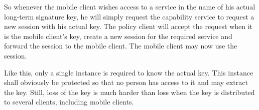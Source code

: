 So whenever the mobile client wishes access to a service in the name of his actual long-term signature key, he will simply request the capability service to request a new session with his actual key.
The policy client will accept the request when it is the mobile client's key, create a new session for the required service and forward the session to the mobile client.
The mobile client may now use the session.

Like this, only a single instance is required to know the actual key.
This instance shall obviously be protected so that no person has access to it and may extract the key.
Still, loss of the key is much harder than loss when the key is distributed to several clients, including mobile clients.

